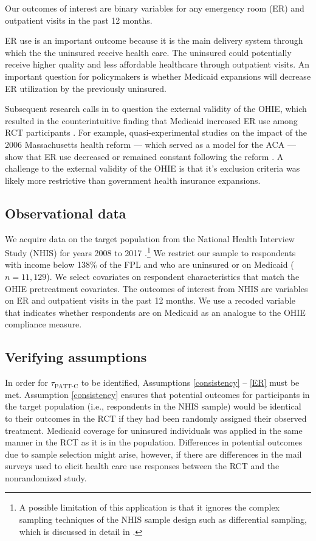 \documentclass[hidelinks,12pt]{article}
\begin{document}
{Our outcomes of interest are binary variables for any emergency room (ER) and outpatient visits in the past 12 months. {\color{red}ER use is an important outcome because it is the main delivery system through which the the uninsured receive health care. The uninsured could potentially receive higher quality and less affordable healthcare through outpatient visits. An important question for policymakers is whether Medicaid expansions will decrease ER utilization by the previously uninsured.   	

Subsequent research calls in to question the external validity of the OHIE, which resulted in the counterintuitive finding that Medicaid increased ER use among RCT participants \citep{finkelstein2012,Taubman}. For example, quasi-experimental studies on the impact of the 2006 Massachusetts health reform --- which served as a model for the ACA --- show that ER use decreased or remained constant following the reform \citep{miller2012effect, kolstad2012impact}. A challenge to the external validity of the OHIE is that it's exclusion criteria was likely more restrictive than government health insurance expansions. 
}

\subsection{Observational data} 

We acquire data on the target population from the National Health Interview Study (NHIS) for years 2008 to 2017 \citep{NHIS}.\footnote{{\color{red}A possible limitation of this application is that it ignores the complex sampling techniques of the NHIS sample design such as differential sampling, which is discussed in detail in \citet{parsons2014design}.}\label{nhis-ftn}} We restrict our sample to respondents with income below 138\% of the FPL and who are uninsured or on Medicaid ($n=11,129$). We select covariates on respondent characteristics that match the OHIE pretreatment covariates. The outcomes of interest from NHIS are variables on ER and outpatient visits in the past 12 months. We use a recoded variable that indicates whether respondents are on Medicaid as an analogue to the OHIE compliance measure. 

\subsection{Verifying assumptions} \label{verifying}

In order for $\tau_{\text{PATT-C}}$ to be identified, Assumptions \ref{consistency} -- \ref{ER} must be met. Assumption \ref{consistency} ensures that potential outcomes for participants in the target population (i.e., respondents in the NHIS sample) would be identical to their outcomes in the RCT if they had been randomly assigned their observed treatment. {\color{red}Medicaid coverage for uninsured individuals was applied in the same manner in the RCT as it is in the population.  Differences in potential outcomes due to sample selection might arise, however, if there are differences in the mail surveys used to elicit health care use responses between the RCT and the nonrandomized study. }
 
}
\end{document}
